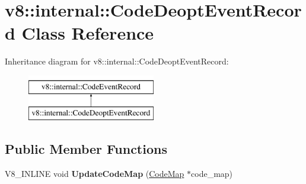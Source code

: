 \hypertarget{classv8_1_1internal_1_1CodeDeoptEventRecord}{}\section{v8\+:\+:internal\+:\+:Code\+Deopt\+Event\+Record Class Reference}
\label{classv8_1_1internal_1_1CodeDeoptEventRecord}
Inheritance diagram for v8\+:\+:internal\+:\+:Code\+Deopt\+Event\+Record\+:\begin{figure}[H]
\begin{center}
\leavevmode
\includegraphics[height=2.000000cm]{classv8_1_1internal_1_1CodeDeoptEventRecord}
\end{center}
\end{figure}
\subsection*{Public Member Functions}
\begin{DoxyCompactItemize}
\item 
\mbox{\label{classv8_1_1internal_1_1CodeDeoptEventRecord_a81c9d24bcbc32b930c5d000548e0a6cd}} 
V8\+\_\+\+I\+N\+L\+I\+NE void {\bfseries Update\+Code\+Map} (\mbox{\hyperlink{classv8_1_1internal_1_1CodeMap}{Code\+Map}} $\ast$code\+\_\+map)
\end{DoxyCompactItemize}
